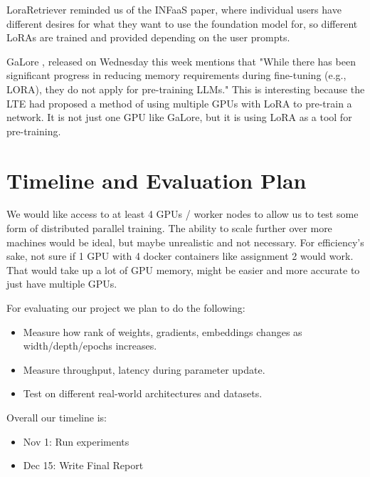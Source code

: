 \documentclass[pdftex,twocolumn,10pt,letterpaper]{article}
\begin{document}
LoraRetriever \cite{zhao2024loraretriever} reminded us of the INFaaS paper, where individual users have different desires for what they want to use the foundation model for, so different LoRAs are trained and provided depending on the user prompts. 

GaLore \cite{zhao2024galore}, released on Wednesday this week mentions that "While there has been significant progress in reducing memory requirements during fine-tuning (e.g., LORA), they do not apply for pre-training LLMs." This is interesting because the LTE had proposed a method of using multiple GPUs with LoRA to pre-train a network. It is not just one GPU like GaLore, but it is using LoRA as a tool for pre-training.

\section{Timeline and Evaluation Plan}

We would like access to at least 4 GPUs / worker nodes to allow us to test some form of distributed parallel training. The ability to scale further over more machines would be ideal, but maybe unrealistic and not necessary. For efficiency's sake, not sure if 1 GPU with 4 docker containers like assignment 2 would work. That would take up a lot of GPU memory, might be easier and more accurate to just have multiple GPUs.

For evaluating our project we plan to do the following:
\begin{itemize}
  \item Measure how rank of weights, gradients, embeddings changes as width/depth/epochs increases.
  \item Measure throughput, latency during parameter update.
  \item Test on different real-world architectures and datasets.
\end{itemize}

Overall our timeline is:

\begin{itemize}
  \item Nov 1: Run experiments 
  \item Dec 15: Write Final Report
\end{itemize}

{


}
\end{document}
